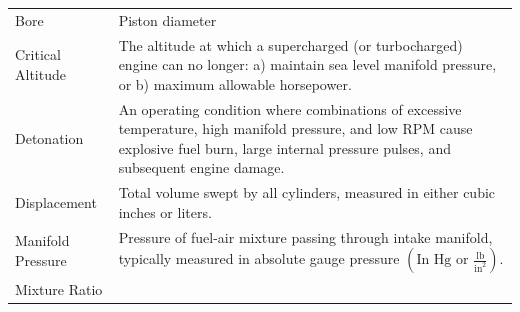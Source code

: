 \documentclass[
]{book}
\begin{document}
\begin{longtable}[]{@{}ll@{}}
\toprule
\endhead
\begin{minipage}[t]{0.21\columnwidth}\raggedright
Bore\strut
\end{minipage} & \begin{minipage}[t]{0.73\columnwidth}\raggedright
Piston diameter\strut
\end{minipage}\tabularnewline
\begin{minipage}[t]{0.21\columnwidth}\raggedright
Critical Altitude\strut
\end{minipage} & \begin{minipage}[t]{0.73\columnwidth}\raggedright
The altitude at which a supercharged (or turbocharged) engine can no longer: a) maintain sea level manifold pressure, or b) maximum allowable horsepower.\strut
\end{minipage}\tabularnewline
\begin{minipage}[t]{0.21\columnwidth}\raggedright
Detonation\strut
\end{minipage} & \begin{minipage}[t]{0.73\columnwidth}\raggedright
An operating condition where combinations of excessive temperature, high manifold pressure, and low RPM cause explosive fuel burn, large internal pressure pulses, and subsequent engine damage.\strut
\end{minipage}\tabularnewline
\begin{minipage}[t]{0.21\columnwidth}\raggedright
Displacement\strut
\end{minipage} & \begin{minipage}[t]{0.73\columnwidth}\raggedright
Total volume swept by all cylinders, measured in either cubic inches or liters.\strut
\end{minipage}\tabularnewline
\begin{minipage}[t]{0.21\columnwidth}\raggedright
Manifold Pressure\strut
\end{minipage} & \begin{minipage}[t]{0.73\columnwidth}\raggedright
Pressure of fuel-air mixture passing through intake manifold, typically measured in absolute gauge pressure \(\left( \text{In Hg or } \frac{\text{lb}}{\text{in}^2} \right)\).\strut
\end{minipage}\tabularnewline
\begin{minipage}[t]{0.21\columnwidth}\raggedright
Mixture Ratio\strut
\end{minipage} & \begin{minipage}[t]{0.73\columnwidth}\raggedright

\end{minipage}
\end{longtable}
\end{document}
